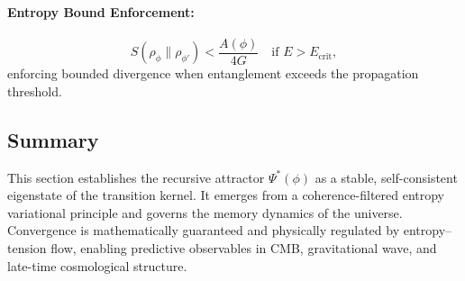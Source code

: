 \paragraph{Entropy Bound Enforcement:}
\[
S(\rho_\phi \| \rho_{\phi'}) < \frac{A(\phi)}{4G} \quad \text{if } E > E_{\text{crit}},
\]
enforcing bounded divergence when entanglement exceeds the propagation threshold.

\subsection{Summary}

This section establishes the recursive attractor \( \Psi^*(\phi) \) as a stable, self-consistent eigenstate of the transition kernel. It emerges from a coherence-filtered entropy variational principle and governs the memory dynamics of the universe. Convergence is mathematically guaranteed and physically regulated by entropy–tension flow, enabling predictive observables in CMB, gravitational wave, and late-time cosmological structure.

